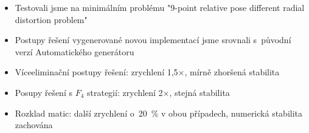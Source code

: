 \documentclass[cmpiitalkstyle, 25pt]{cmptalk}
\begin{document}
\begin{cmptalkslide}[Experimenty]
  \begin{itemize}
    \item Testovali jsme na minimálním problému "9-point relative pose different radial distortion problem" \cite{9pt}
    \item Postupy řešení vygenerované novou implementací jsme srovnali s~původní verzí Automatického generátoru
    \item Víceeliminační postupy řešení: zrychlení 1,5$\times$, mírně zhoršená stabilita
    \item Posupy řešení s $F_4$ strategií: zrychlení 2$\times$, stejná stabilita
    \item Rozklad matic: další zrychlení o~20~\% v obou případech, numerická stabilita zachována
  \end{itemize}


\end{cmptalkslide}
\end{document}
